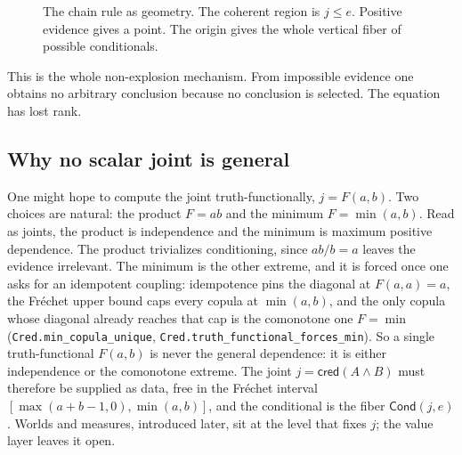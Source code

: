 \documentclass[11pt,a4paper]{article}
\newcommand{\cred}{\mathsf{cred}}
\newcommand{\Cond}{\mathsf{Cond}}
\newcommand{\Lean}[1]{\texttt{#1}}
\begin{document}
\begin{figure}[h]
\centering
{}
\caption{The chain rule as geometry.  The coherent region is
$j\le e$.  Positive evidence gives a point.  The origin gives the
whole vertical fiber of possible conditionals.}
\label{fig:cond-geometry}
\end{figure}

This is the whole non-explosion mechanism.  From impossible evidence
one obtains no arbitrary conclusion because no conclusion is selected.
The equation has lost rank.

\subsection{Why no scalar joint is general}
One might hope to compute the joint truth-functionally, $j=F(a,b)$.
Two choices are natural: the product $F=ab$ and the minimum
$F=\min(a,b)$.  Read as joints, the product is independence and the
minimum is maximum positive dependence.  The product trivializes
conditioning, since $ab/b=a$ leaves the evidence irrelevant.  The
minimum is the other extreme, and it is forced once one asks for an
idempotent coupling: idempotence pins the diagonal at $F(a,a)=a$, the
Fr\'echet upper bound caps every copula at $\min(a,b)$, and the only
copula whose diagonal already reaches that cap is the comonotone one
$F=\min$ (\Lean{Cred.min\_copula\_unique},
\Lean{Cred.truth\_functional\_forces\_min}).  So a single
truth-functional $F(a,b)$ is never the general dependence: it is either
independence or the comonotone extreme.  The joint
$j=\cred(A\wedge B)$ must therefore be supplied as data, free in the
Fr\'echet interval $[\max(a+b-1,0),\min(a,b)]$, and the conditional is
the fiber $\Cond(j,e)$.  Worlds and measures, introduced later, sit at
the level that fixes $j$; the value layer leaves it open.
\end{document}
